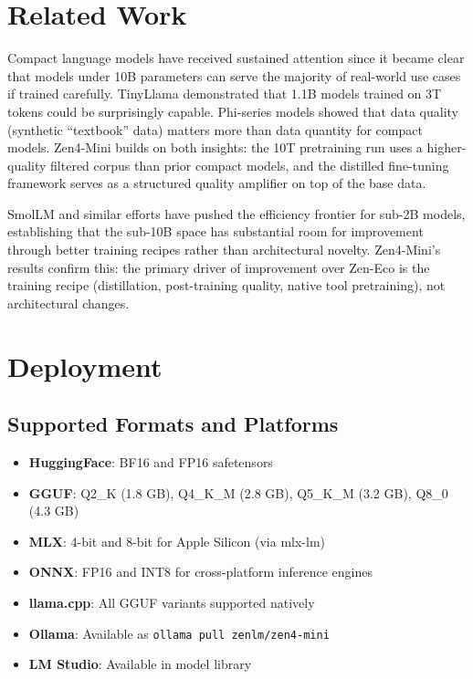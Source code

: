 \documentclass[11pt,a4paper]{article}
\begin{document}
\section{Related Work}

Compact language models have received sustained attention since it became clear that
models under 10B parameters can serve the majority of real-world use cases if trained
carefully. TinyLlama \cite{zhang2024tinyllama} demonstrated that 1.1B models trained on
3T tokens could be surprisingly capable. Phi-series models \cite{gunasekar2023textbooks}
showed that data quality (synthetic ``textbook'' data) matters more than data quantity
for compact models. Zen4-Mini builds on both insights: the 10T pretraining run uses
a higher-quality filtered corpus than prior compact models, and the distilled fine-tuning
framework serves as a structured quality amplifier on top of the base data.

SmolLM \cite{allal2024smollm} and similar efforts have pushed the efficiency frontier
for sub-2B models, establishing that the sub-10B space has substantial room for
improvement through better training recipes rather than architectural novelty.
Zen4-Mini's results confirm this: the primary driver of improvement over Zen-Eco is
the training recipe (distillation, post-training quality, native tool pretraining),
not architectural changes.

\section{Deployment}

\subsection{Supported Formats and Platforms}

\begin{itemize}
    \item \textbf{HuggingFace}: BF16 and FP16 safetensors
    \item \textbf{GGUF}: Q2\_K (1.8 GB), Q4\_K\_M (2.8 GB), Q5\_K\_M (3.2 GB), Q8\_0 (4.3 GB)
    \item \textbf{MLX}: 4-bit and 8-bit for Apple Silicon (via mlx-lm)
    \item \textbf{ONNX}: FP16 and INT8 for cross-platform inference engines
    \item \textbf{llama.cpp}: All GGUF variants supported natively
    \item \textbf{Ollama}: Available as \texttt{ollama pull zenlm/zen4-mini}
    \item \textbf{LM Studio}: Available in model library
\end{itemize}
\end{document}
